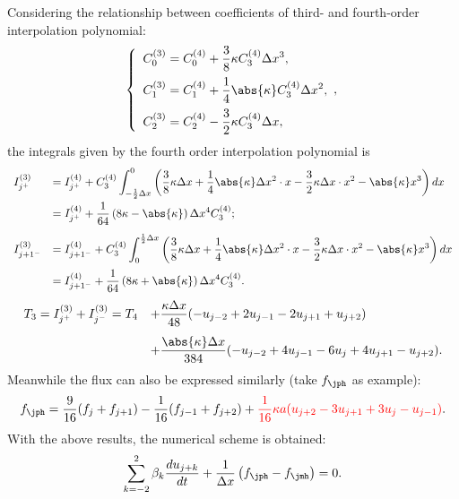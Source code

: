 \documentclass[]{article}
\begin{document}
Considering the relationship between coefficients of third- and fourth-order
interpolation polynomial:
\begin{equation}
    \left\{\begin{array}{l}
	\displaystyle
	C_0^{(3)}=C_0^{(4)}+\frac{3}{8}\kappa C_3^{(4)}\Delta x^3, \\[3mm]
	\displaystyle
	C_1^{(3)}=C_1^{(4)}+\frac{1}{4}\abs{\kappa} C_3^{(4)}\Delta x^2, \\[3mm]
	\displaystyle
	C_2^{(3)}=C_2^{(4)}-\frac{3}{2}\kappa C_3^{(4)}\Delta x, \\
    \end{array},\right. 
    \label{eq:C3-C4}
\end{equation}
the integrals given by the fourth order interpolation polynomial is
\[
\begin{array}{ll}
I^{(3)}_{j^+}&\displaystyle =I^{(4)}_{j^+}+C_3^{(4)}\int_{-\frac{1}{2}\Delta x}^0 \left(\frac{3}{8}\kappa \Delta x +\frac{1}{4}\abs{\kappa}\Delta x^2\cdot x -\frac{3}{2}\kappa \Delta x\cdot x^2 -\abs{\kappa}x^3\right) dx \\[4mm]
&\displaystyle = I^{(4)}_{j^+}+\frac{1}{64}\left(8\kappa-\abs{\kappa}\right)\Delta x^4C_3^{(4)}; \\[4mm]
I^{(3)}_{j+1^-}&\displaystyle =I^{(4)}_{j+1^-}+C_3^{(4)}\int_0^{\frac{1}{2}\Delta x} \left(\frac{3}{8}\kappa \Delta x +\frac{1}{4}\abs{\kappa}\Delta x^2\cdot x -\frac{3}{2}\kappa \Delta x\cdot x^2 -\abs{\kappa}x^3\right) dx \\[4mm]
&\displaystyle= I^{(4)}_{j+1^-}+\frac{1}{64}\left(8\kappa+\abs{\kappa}\right)\Delta x^4C_3^{(4)}.\\
\end{array}
\]
\[
\begin{array}{ll}
T_3 = I^{(3)}_{j^+}+ I^{(3)}_{j^-} = T_4&\displaystyle +\frac{\kappa\Delta x}{48}(-u_{j-2}+2u_{j-1}-2u_{j+1}+u_{j+2}) \\[4mm]
&\displaystyle +\frac{\abs{\kappa}\Delta x}{384} (-u_{j-2}+4u_{j-1}-6u_j+4u_{j+1}-u_{j+2}). \\
\end{array}
\]
Meanwhile the flux can also be expressed similarly (take $f_\jph$ as example):
\[
    f_{\jph}=\frac{9}{16}(f_j+f_{j+1})-\frac{1}{16}(f_{j-1}+f_{j+2})+{\color{red}\frac{1}{16}\kappa a(u_{j+2}-3u_{j+1}+3u_{j}-u_{j-1})}.
\]
With the above results, the numerical scheme is obtained:
\begin{equation}
    \sum_{k=-2}^2\beta_k \frac{d u_{j+k}}{dt}+\frac{1}{\Delta
    x}\left(f_{\jph}-f_{\jmh}\right)=0.
    \label{eq:QUICK-duj-dt-nodal}
\end{equation}
\end{document}
